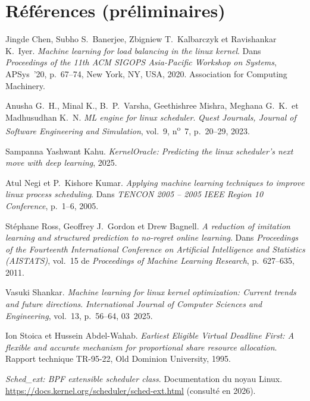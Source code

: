 \documentclass[11pt,a4paper]{article}
\begin{document}
\section{Références (préliminaires)}
\begin{enumerate}[leftmargin=2em,itemsep=4pt,label={[\arabic*]}]
  \item Jingde Chen, Subho S.\ Banerjee, Zbigniew T.\ Kalbarczyk et Ravishankar K.\ Iyer.
    \emph{Machine learning for load balancing in the linux kernel}. Dans
    \textit{Proceedings of the 11th ACM SIGOPS Asia-Pacific Workshop on Systems},
    APSys~'20, p.~67--74, New York, NY, USA, 2020. Association for Computing Machinery.
  \item Anusha G.~H., Minal K., B.~P.\ Varsha, Geethishree Mishra, Meghana G.~K.\ et
    Madhusudhan K.~N. \emph{ML engine for linux scheduler}. \textit{Quest Journals,
    Journal of Software Engineering and Simulation}, vol.~9, n\textsuperscript{o}~7,
    p.~20--29, 2023.
  \item Sampanna Yashwant Kahu. \emph{KernelOracle: Predicting the linux scheduler's
    next move with deep learning}, 2025.
  \item Atul Negi et P.\ Kishore Kumar. \emph{Applying machine learning techniques to
    improve linux process scheduling}. Dans \textit{TENCON 2005 -- 2005 IEEE Region 10
    Conference}, p.~1--6, 2005.
  \item Stéphane Ross, Geoffrey J.\ Gordon et Drew Bagnell. \emph{A reduction of
    imitation learning and structured prediction to no-regret online learning}. Dans
    \textit{Proceedings of the Fourteenth International Conference on Artificial
    Intelligence and Statistics (AISTATS)}, vol.~15 de \textit{Proceedings of Machine
    Learning Research}, p.~627--635, 2011.
  \item Vasuki Shankar. \emph{Machine learning for linux kernel optimization: Current
    trends and future directions}. \textit{International Journal of Computer Sciences
    and Engineering}, vol.~13, p.~56--64, 03~2025.
  \item Ion Stoica et Hussein Abdel-Wahab. \emph{Earliest Eligible Virtual Deadline
    First: A flexible and accurate mechanism for proportional share resource
    allocation}. Rapport technique TR-95-22, Old Dominion University, 1995.
  \item \emph{Sched\_ext: BPF extensible scheduler class}. Documentation du noyau
    Linux. \url{https://docs.kernel.org/scheduler/sched-ext.html} (consulté en 2026).
\end{enumerate}
\end{document}

